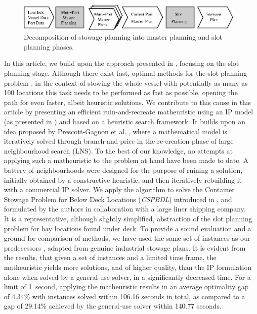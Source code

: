 \documentclass[preprint,11pt,3p]{elsarticle}
\begin{document}
\begin{figure}[ht]
\centering
\includegraphics[width=1.0\linewidth]{Figures/quad.eps}
\caption{Decomposition of stowage planning into master planning and slot planning phases.}
\label{fig:decomposition}
\end{figure}


In this article, we build upon the approach presented in \cite{PDJB11, PDJB12, DJJRA12}, focusing on the slot planning stage. Although there exist fast, optimal methods for the slot planning problem \cite{DJJRA12}, in the context of stowing the whole vessel with potentially as many as 100 locations this task needs to be performed as fast as possible, opening the path for even faster, albeit heuristic solutions. We contribute to this cause in this article by presenting an efficient ruin-and-recreate matheuristic using an IP model (as presented in \cite{DPhD}) and based on a heuristic search framework. It builds upon an idea proposed by Prescott-Gagnon et al. \cite{PGDR-Math}, where a mathematical model is iteratively solved through branch-and-price in the re-creation phase of large neighbourhood search (LNS). To the best of our knowledge, no attempts at applying such a matheuristic to the problem at hand have been made to date. A battery of neighbourhoods were designed for the purpose of ruining a solution, initially obtained by a constructive heuristic, and then iteratively rebuilding it with a commercial IP solver. We apply the algorithm to solve the Container Stowage Problem for Below Deck Locations (\textit{CSPBDL}) introduced in \cite{DJJRA12}, and formulated by the authors in collaboration with a large liner shipping company. It is a representative, although slightly simplified, abstraction of the slot planning problem for bay locations found under deck. To provide a sound evaluation and a ground for comparison of methods, we have used the same set of instances as our predecessors \cite{DJJRA12}, adapted from genuine industrial stowage plans. It is evident from the results, that given a set of instances and a limited time frame, the matheuristic yields more solutions, and of higher quality, than the IP formulation alone when solved by a general-use solver, in a significantly decreased time. For a limit of 1~second, applying the matheuristic results in an average optimality gap of 4.34\% with instances solved within 106.16 seconds in total, as compared to a gap of 29.14\% achieved by the general-use solver within 140.77 seconds.
\end{document}
